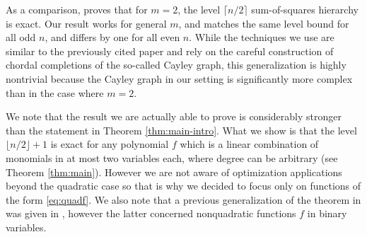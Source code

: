 \documentclass{article}
\newcommand{\RR}{\mathbb{R}}
\theoremstyle{definition}
\begin{document}
As a comparison, \cite[Theorem 2]{fawzi2016sparse} proves that for $m=2$, the level $\lceil n/2\rceil$ sum-of-squares hierarchy is exact. Our result works for general $m$, and matches the same level bound for all odd $n$, and differs by one for all even $n$.
While the techniques we use are similar to the previously cited paper and rely on the careful construction of chordal completions of the so-called Cayley graph, this generalization is highly nontrivial because the Cayley graph in our setting is significantly more complex than in the case where $m=2$.

We note that the result we are actually able to prove is considerably stronger than the statement in Theorem \ref{thm:main-intro}. What we show is that the level $\lfloor n/2\rfloor+1$ is exact for any polynomial $f$ which is a linear combination of monomials in at most two variables each, where degree can be arbitrary (see Theorem \ref{thm:main}). However we are not aware of optimization applications beyond the quadratic case so that is why we decided to focus only on functions of the form \eqref{eq:quadf}.
 We also note that a previous generalization of the theorem in \cite{fawzi2016sparse} was given in \cite{sakaue2017exact}, however the latter concerned nonquadratic functions $f$ in binary variables.
\end{document}
